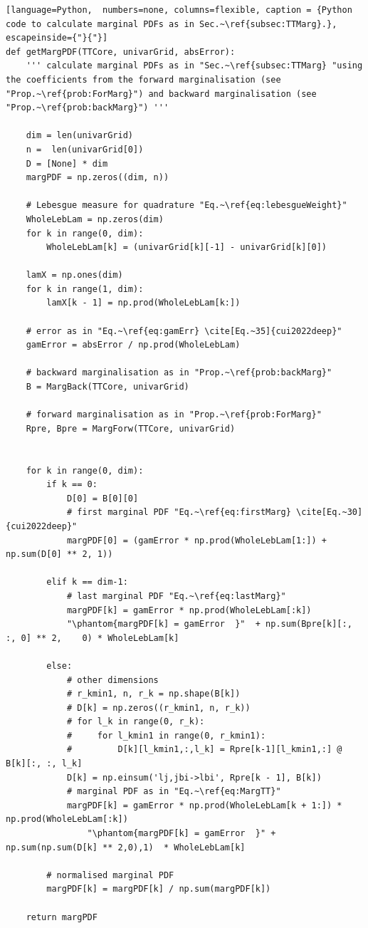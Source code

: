 \begin{lstlisting}[language=Python,	 numbers=none, columns=flexible, caption = {Python code to calculate marginal PDFs as in Sec.~\ref{subsec:TTMarg}.}, escapeinside={"}{"}]
def getMargPDF(TTCore, univarGrid, absError):
	''' calculate marginal PDFs as in "Sec.~\ref{subsec:TTMarg} "using the coefficients from the forward marginalisation (see "Prop.~\ref{prob:ForMarg}") and backward marginalisation (see "Prop.~\ref{prob:backMarg}") '''

	dim = len(univarGrid)
	n =  len(univarGrid[0])
	D = [None] * dim
	margPDF = np.zeros((dim, n))
	
	# Lebesgue measure for quadrature "Eq.~\ref{eq:lebesgueWeight}"
	WholeLebLam = np.zeros(dim)
	for k in range(0, dim):
		WholeLebLam[k] = (univarGrid[k][-1] - univarGrid[k][0])
	
	lamX = np.ones(dim)
	for k in range(1, dim):
		lamX[k - 1] = np.prod(WholeLebLam[k:])
		
	# error as in "Eq.~\ref{eq:gamErr} \cite[Eq.~35]{cui2022deep}"
	gamError = absError / np.prod(WholeLebLam)
	
	# backward marginalisation as in "Prop.~\ref{prob:backMarg}"
	B = MargBack(TTCore, univarGrid)
	
	# forward marginalisation as in "Prop.~\ref{prob:ForMarg}"
	Rpre, Bpre = MargForw(TTCore, univarGrid)
	
	
	for k in range(0, dim):
		if k == 0:
			D[0] = B[0][0]
			# first marginal PDF "Eq.~\ref{eq:firstMarg} \cite[Eq.~30]{cui2022deep}"
			margPDF[0] = (gamError * np.prod(WholeLebLam[1:]) + np.sum(D[0] ** 2, 1))
		
		elif k == dim-1:
			# last marginal PDF "Eq.~\ref{eq:lastMarg}"
			margPDF[k] = gamError * np.prod(WholeLebLam[:k]) 
			"\phantom{margPDF[k] = gamError  }"  + np.sum(Bpre[k][:, :, 0] ** 2, 	0) * WholeLebLam[k]
		
		else:
			# other dimensions
			# r_kmin1, n, r_k = np.shape(B[k])
			# D[k] = np.zeros((r_kmin1, n, r_k))
			# for l_k in range(0, r_k):
			#     for l_kmin1 in range(0, r_kmin1):
			#         D[k][l_kmin1,:,l_k] = Rpre[k-1][l_kmin1,:] @ B[k][:, :, l_k]
			D[k] = np.einsum('lj,jbi->lbi', Rpre[k - 1], B[k])
			# marginal PDF as in "Eq.~\ref{eq:MargTT}"
			margPDF[k] = gamError * np.prod(WholeLebLam[k + 1:]) * np.prod(WholeLebLam[:k]) 
				"\phantom{margPDF[k] = gamError  }" + np.sum(np.sum(D[k] ** 2,0),1)  * WholeLebLam[k]
		
		# normalised marginal PDF
		margPDF[k] = margPDF[k] / np.sum(margPDF[k])
		
	return margPDF
\end{lstlisting}

